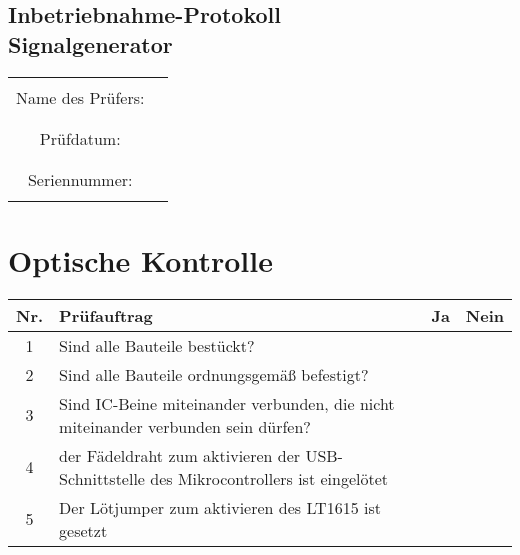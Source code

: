 \begin{center}
\section*{Inbetriebnahme-Protokoll \\ Signalgenerator}

	\begin{tabular}{|c|p{10cm}|}
		\hline
		& \\
		Name des Prüfers: &  \\
		& \\
		\hline
		& \\
		Prüfdatum: & \\
		& \\
		\hline
		& \\
		Seriennummer: & \\
		& \\
		\hline
	\end{tabular}
\end{center}

\section{Optische Kontrolle}

\begin{flushleft}
	\begin{tabular}{|c||p{10cm}|c|c|}
		\hline
		Nr. & Prüfauftrag & Ja & Nein \\
		\hline
		1 & Sind alle Bauteile bestückt? & & \\
		\hline
		2 & Sind alle Bauteile ordnungsgemäß befestigt? & & \\
		\hline
		3 & Sind IC-Beine miteinander verbunden, die nicht miteinander verbunden sein dürfen? & & \\
		\hline
		4 & der Fädeldraht zum aktivieren der USB-Schnittstelle des Mikrocontrollers ist eingelötet & & \\
		\hline
		5 & Der Lötjumper zum aktivieren des LT1615 ist gesetzt & & \\
		\hline
	\end{tabular}
\end{flushleft}


